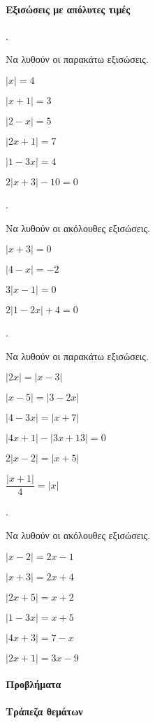 \documentclass[11pt,a4paper,twocolumn]{article}
\newcounter{askhsh}
\newcommand{\askhsh}{{\large\theaskhsh.}\ \addtocounter{askhsh}{1}}
\begin{document}
\paragraph{Εξισώσεις με απόλυτες τιμές}
\askhsh Να λυθούν οι παρακάτω εξισώσεις.
\begin{multicols}{2}
\begin{alist}
\item $|x|=4$
\item $|x+1|=3$
\item $|2-x|=5$
\item $|2x+1|=7$
\item $|1-3x|=4$
\item $2|x+3|-10=0$
\end{alist}
\end{multicols}
\askhsh Να λυθούν οι ακόλουθες εξισώσεις.
\begin{multicols}{2}
\begin{alist}
\item $|x+3|=0$
\item $|4-x|=-2$
\item $3|x-1|=0$
\item $2|1-2x|+4=0$
\end{alist}
\end{multicols}
\askhsh Να λυθούν οι παρακάτω εξισώσεις.
\begin{multicols}{2}
\begin{alist}[leftmargin=5mm]
\item $|2x|=|x-3|$
\item $|x-5|=|3-2x|$
\item $|4-3x|=|x+7|$
\item $|4x+1|-|3x+13|=0$
\item $2|x-2|=|x+5|$
\item $\dfrac{|x+1|}{4}=|x|$
\end{alist}
\end{multicols}
\askhsh Να λυθούν οι ακόλουθες εξισώσεις.
\begin{multicols}{2}
\begin{alist}
\item $|x-2|=2x-1$
\item $|x+3|=2x+4$
\item $|2x+5|=x+2$
\item $|1-3x|=x+5$
\item $|4x+3|=7-x$
\item $|2x+1|=3x-9$
\end{alist}
\end{multicols}
\paragraph{Προβλήματα}
\paragraph{Τράπεζα θεμάτων}
\end{document}
